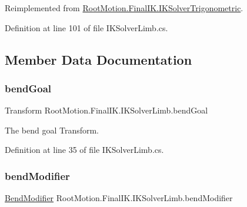 Reimplemented from \mbox{\hyperlink{class_root_motion_1_1_final_i_k_1_1_i_k_solver_trigonometric_a0be97e7ca173129544d6e8dca5e2c37d}{Root\+Motion.\+Final\+I\+K.\+I\+K\+Solver\+Trigonometric}}.



Definition at line 101 of file I\+K\+Solver\+Limb.\+cs.



\subsection{Member Data Documentation}
\mbox{\label{class_root_motion_1_1_final_i_k_1_1_i_k_solver_limb_a94c337fa04b1a6349e6788821acdb387}} 
\subsubsection{\texorpdfstring{bend\+Goal}{bendGoal}}
{\footnotesize\ttfamily Transform Root\+Motion.\+Final\+I\+K.\+I\+K\+Solver\+Limb.\+bend\+Goal}



The bend goal Transform. 



Definition at line 35 of file I\+K\+Solver\+Limb.\+cs.

\mbox{\label{class_root_motion_1_1_final_i_k_1_1_i_k_solver_limb_a8db1d3059608300fd358ff23d0aa70de}} 
\subsubsection{\texorpdfstring{bend\+Modifier}{bendModifier}}
{\footnotesize\ttfamily \mbox{\hyperlink{class_root_motion_1_1_final_i_k_1_1_i_k_solver_limb_ae89bba0551841f9418b918ef8bff893c}{Bend\+Modifier}} Root\+Motion.\+Final\+I\+K.\+I\+K\+Solver\+Limb.\+bend\+Modifier}



